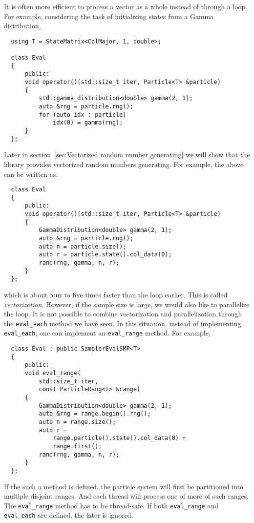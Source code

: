 It is often more efficient to process a vector as a whole instead of through a
loop. For example, considering the task of initializing states from a Gamma
distribution,
\begin{Verbatim}
  using T = StateMatrix<ColMajor, 1, double>;

  class Eval
  {
      public:
      void operator()(std::size_t iter, Particle<T> &particle)
      {
          std::gamma_distribution<double> gamma(2, 1);
          auto &rng = particle.rng();
          for (auto idx : particle)
              idx(0) = gamma(rng);
      }
  };
\end{Verbatim}
Later in section~\ref{sec:Vectorized random number generating} we will show
that the library provides vectorized random numbers generating. For example,
the above can be written as,
\begin{Verbatim}
  class Eval
  {
      public:
      void operator()(std::size_t iter, Particle<T> &particle)
      {
          GammaDistribution<double> gamma(2, 1);
          auto &rng = particle.rng();
          auto n = particle.size();
          auto r = particle.state().col_data(0);
          rand(rng, gamma, n, r);
      }
  };
\end{Verbatim}
which is about four to five times faster than the loop earlier. This is called
\emph{vectorization}. However, if the sample size is large, we would also like
to parallelize the loop. It is not possible to combine vectorization and
parallelization through the \verb|eval_each| method we have seen. In this
situation, instead of implementing \verb|eval_each|, one can implement an
\verb|eval_range| method. For example,
\begin{Verbatim}
  class Eval : public SamplerEvalSMP<T>
  {
      public:
      void eval_range(
          std::size_t iter,
          const ParticleRang<T> &range)
      {
          GammaDistribution<double> gamma(2, 1);
          auto &rng = range.begin().rng();
          auto n = range.size();
          auto r =
              range.particle().state().col_data(0) +
              range.first();
          rand(rng, gamma, n, r);
      }
  };
\end{Verbatim}
If the such a method is defined, the particle system will first be partitioned
into multiple disjoint ranges. And each thread will process one of more of such
ranges. The \verb|eval_range| method has to be thread-safe. If both
\verb|eval_range| and \verb|eval_each| are defined, the later is ignored.

